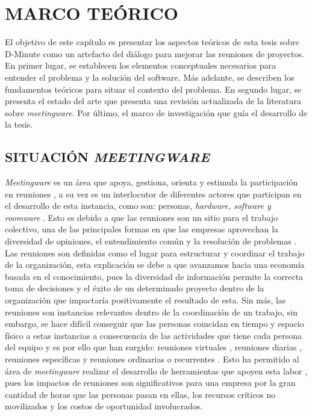 \section{MARCO TEÓRICO}

El objetivo de este capítulo es presentar los aspectos teóricos de esta tesis sobre D-Minute como un artefacto del diálogo para mejorar las reuniones de proyectos. En primer lugar, se establecen los elementos conceptuales necesarios para entender el problema y la solución del software. Más adelante, se describen los fundamentos teóricos para situar el contexto del problema. En segundo lugar, se presenta el estado del arte que presenta una revisión actualizada de la literatura sobre \textit{meetingware}. Por último, el marco de investigación que guía el desarrollo de la tesis.

\subsection{SITUACIÓN \textit{MEETINGWARE}}

\textit{Meetingware} es un área que apoya, gestiona, orienta y estimula la participación en reuniones  \cite{RN7}, a su vez es un interlocutor de diferentes actores que participan en el desarrollo de esta instancia, como son: personas, \textit{hardware, software y roomware} \cite{RN7}. Esto es debido a que las reuniones son un sitio para el trabajo colectivo, una de las principales formas en que las empresas aprovechan la diversidad de opiniones, el entendimiento común y la resolución de problemas \cite{RN25}. Las reuniones son definidas como el lugar para estructurar y coordinar el trabajo de la organización, esta explicación se debe a que avanzamos hacia una economía basada en el conocimiento, pues la diversidad de información permite la correcta toma de decisiones y el éxito de un determinado proyecto dentro de la organización \cite{RN7} que impactaría positivamente el resultado de esta. Sin más, las reuniones son instancias relevantes dentro de la coordinación de un trabajo, sin embargo, se hace difícil conseguir que las personas coincidan en tiempo y espacio físico a estas instancias a consecuencia de las actividades que tiene cada persona del equipo y es por ello que han surgido: reuniones virtuales \cite{RN23}, reuniones diarias \cite{RN35}, reuniones específicas y reuniones ordinarias o recurrentes \cite{RN25}. Esto ha permitido al área de \textit{meetingware} realizar el desarrollo de herramientas que apoyen esta labor \cite{RN28}, pues los impactos de reuniones son significativos para una empresa por la gran cantidad de horas que las personas pasan en ellas, los recursos críticos no movilizados y los costos de oportunidad involucrados.

